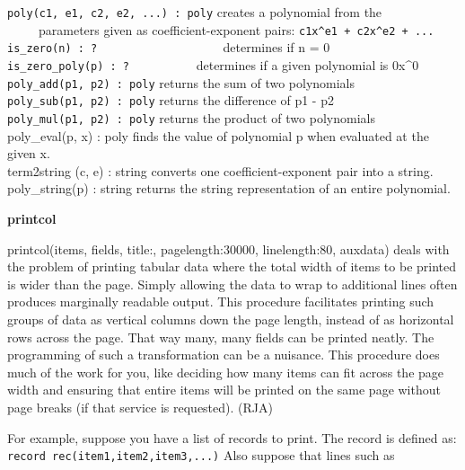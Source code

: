 \texttt{poly(c1, e1, c2, e2, ...) : poly} creates a polynomial from
the\\
 \ \ \ \ \ parameters given as coefficient-exponent pairs:
\texttt{c1x\^{}e1 + c2x\^{}e2 + ...}\\
\texttt{is\_zero(n) : ?
\ }\ \ \ \ \ \ \ \ \ \ \ \ \ \ \ \ \ \ determines if n = 0\\
\texttt{is\_zero\_poly(p) : ?} \ \ \ \ \ \ \ \ \ \ determines if a given
polynomial is 0x\^{}0\\
\texttt{poly\_add(p1, p2) : poly} returns the sum of two
polynomials\\
\texttt{poly\_sub(p1, p2) : poly} returns the difference of p1 -
p2\\
\texttt{poly\_mul(p1, p2) : poly} returns the product of two
polynomials\\
\textsf{poly\_eval(p, x) : poly} finds the value of polynomial p when
evaluated at the given x.\\
\textsf{term2string (c, e) : string} converts one coefficient-exponent
pair into a string.\\
\textsf{poly\_string(p) : string} returns the string representation of
an entire polynomial. 

{\sffamily\bfseries
printcol}

printcol(items, fields, title:{\textquotedbl}{\textquotedbl},
pagelength:30000, linelength:80, auxdata) deals with the problem of
printing tabular data where the total width of items to be printed is
wider than the page. Simply allowing the data to wrap to additional
lines often produces marginally readable output. This procedure
facilitates printing such groups of data as vertical columns down the
page length, instead of as horizontal rows across the page. That way
many, many fields can be printed neatly. The programming of such a
transformation can be a nuisance. This procedure does much of the work
for you, like deciding how many items can fit across the page width and
ensuring that entire items will be printed on the same page without
page breaks (if that service is requested). (RJA)

For example, suppose you have a list of records to print. The record is
defined as:\\
\texttt{record rec(item1,item2,item3,...)} Also suppose that lines such
as


